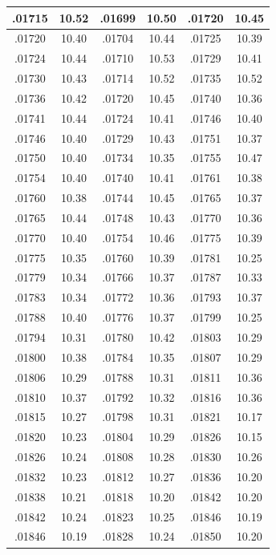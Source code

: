 \documentclass[10pt,twoside]{report}
\begin{document}
\begin{appendices}
\begin{longtable}{|c|c||c|c||c|c|}
.01715 & 10.52 & .01699 & 10.50 & .01720 & 10.45\\\hline
.01720 & 10.40 & .01704 & 10.44 & .01725 & 10.39\\\hline
.01724 & 10.44 & .01710 & 10.53 & .01729 & 10.41\\\hline
.01730 & 10.43 & .01714 & 10.52 & .01735 & 10.52\\\hline
.01736 & 10.42 & .01720 & 10.45 & .01740 & 10.36\\\hline
.01741 & 10.44 & .01724 & 10.41 & .01746 & 10.40\\\hline
.01746 & 10.40 & .01729 & 10.43 & .01751 & 10.37\\\hline
.01750 & 10.40 & .01734 & 10.35 & .01755 & 10.47\\\hline
.01754 & 10.40 & .01740 & 10.41 & .01761 & 10.38\\\hline
.01760 & 10.38 & .01744 & 10.45 & .01765 & 10.37\\\hline
.01765 & 10.44 & .01748 & 10.43 & .01770 & 10.36\\\hline
.01770 & 10.40 & .01754 & 10.46 & .01775 & 10.39\\\hline
.01775 & 10.35 & .01760 & 10.39 & .01781 & 10.25\\\hline
.01779 & 10.34 & .01766 & 10.37 & .01787 & 10.33\\\hline
.01783 & 10.34 & .01772 & 10.36 & .01793 & 10.37\\\hline
.01788 & 10.40 & .01776 & 10.37 & .01799 & 10.25\\\hline
.01794 & 10.31 & .01780 & 10.42 & .01803 & 10.29\\\hline
.01800 & 10.38 & .01784 & 10.35 & .01807 & 10.29\\\hline
.01806 & 10.29 & .01788 & 10.31 & .01811 & 10.36\\\hline
.01810 & 10.37 & .01792 & 10.32 & .01816 & 10.36\\\hline
.01815 & 10.27 & .01798 & 10.31 & .01821 & 10.17\\\hline
.01820 & 10.23 & .01804 & 10.29 & .01826 & 10.15\\\hline
.01826 & 10.24 & .01808 & 10.28 & .01830 & 10.26\\\hline
.01832 & 10.23 & .01812 & 10.27 & .01836 & 10.20\\\hline
.01838 & 10.21 & .01818 & 10.20 & .01842 & 10.20\\\hline
.01842 & 10.24 & .01823 & 10.25 & .01846 & 10.19\\\hline
.01846 & 10.19 & .01828 & 10.24 & .01850 & 10.20\\\hline

\end{longtable}
\end{appendices}
\end{document}
